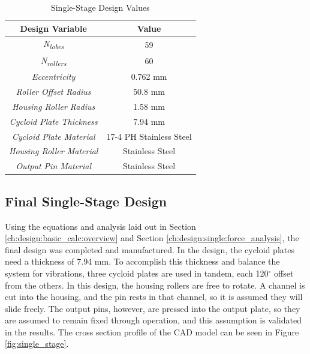 \begin{table}
  \vskip0.2cm
  \caption{Single-Stage Design Values}
  \label{table:single_sizing}
  \begin{center}
    \vskip-0.2cm
    \begin{tabular}{|c|c|}
    \hline
  Design Variable & Value\\
  \hline
  \textit{N\textsubscript{lobes}} & 59\\
  \hline
  \textit{N\textsubscript{rollers}} & 60\\
  \hline
  \textit{Eccentricity} & 0.762 mm\\
  \hline
  \textit{Roller Offset Radius} & 50.8 mm\\
  \hline
  \textit{Housing Roller Radius} & 1.58 mm\\
  \hline
  \textit{Cycloid Plate Thickness} & 7.94 mm\\
  \hline
  \textit{Cycloid Plate Material} & 17-4 PH Stainless Steel\\
  \hline
  \textit{Housing Roller Material} & Stainless Steel\\
  \hline
  \textit{Output Pin Material} & Stainless Steel \\
  \hline
    \end{tabular}
  \end{center}
\end{table}

\subsection{Final Single-Stage Design} \label{ch:design:single:final}

Using the equations and analysis laid out in Section \ref{ch:design:basic_calc:overview} and Section \ref{ch:design:single:force_analysis}, the final design was completed and manufactured. In the design, the cycloid plates need a thickness of 7.94 mm. To accomplish this thickness and balance the system for vibrations, three cycloid plates are used in tandem, each 120$^\circ$ offset from the others. In this design, the housing rollers are free to rotate. A channel is cut into the housing, and the pin rests in that channel, so it is assumed they will slide freely. The output pins, however, are pressed into the output plate, so they are assumed to remain fixed through operation, and this assumption is validated in the results. The cross section profile of the CAD model can be seen in Figure \ref{fig:single_stage}.

